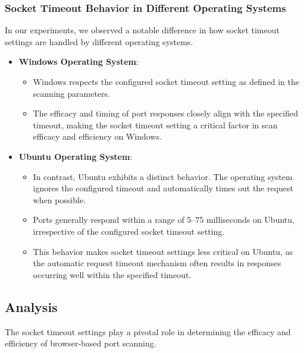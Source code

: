 \subsubsection{Socket Timeout Behavior in Different Operating Systems}
\label{section:socket-timeout-comparison}

In our experiments, we observed a notable difference in how socket timeout settings are handled by different operating systems.

\begin{itemize}
    \item \textbf{Windows Operating System}:
    \begin{itemize}
        \item Windows respects the configured socket timeout setting as defined in the scanning parameters.
        \item The efficacy and timing of port responses closely align with the specified timeout, making the socket timeout setting a critical factor in scan efficacy and efficiency on Windows.
    \end{itemize}
    
    \item \textbf{Ubuntu Operating System}:
    \begin{itemize}
        \item In contrast, Ubuntu exhibits a distinct behavior. The operating system ignores the configured timeout and automatically times out the request when possible.
        \item Ports generally respond within a range of 5--75 milliseconds on Ubuntu, irrespective of the configured socket timeout setting.
        \item This behavior makes socket timeout settings less critical on Ubuntu, as the automatic request timeout mechanism often results in responses occurring well within the specified timeout.
    \end{itemize}
\end{itemize}


\subsection{Analysis}

The socket timeout settings play a pivotal role in determining the efficacy and efficiency of browser-based port scanning.

